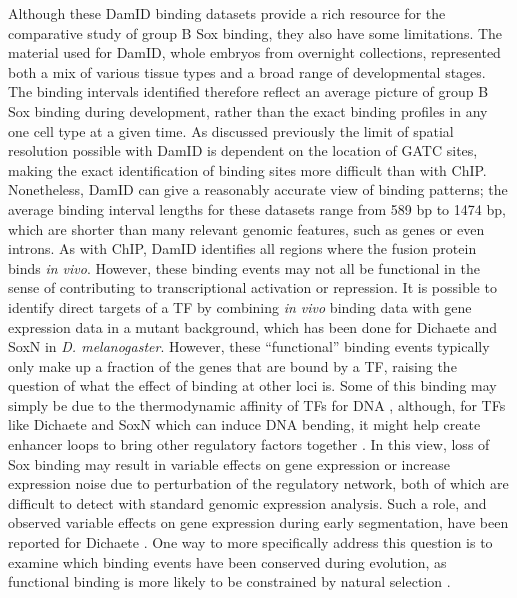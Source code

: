 Although these DamID binding datasets provide a rich resource for the comparative study of group B Sox binding, they also have some limitations. The material used for DamID, whole embryos from overnight collections, represented both a mix of various tissue types and a broad range of developmental stages. The binding intervals identified therefore reflect an average picture of group B Sox binding during development, rather than the exact binding profiles in any one cell type at a given time. As discussed previously the limit of spatial resolution possible with DamID is dependent on the location of GATC sites, making the exact identification of binding sites more difficult than with ChIP. Nonetheless, DamID can give a reasonably accurate view of binding patterns; the average binding interval lengths for these datasets range from 589 bp to 1474 bp, which are shorter than many relevant genomic features, such as genes or even introns. As with ChIP, DamID identifies all regions where the fusion protein binds \emph{in vivo}. However, these binding events may not all be functional in the sense of contributing to transcriptional activation or repression. It is possible to identify direct targets of a TF by combining \emph{in vivo} binding data with gene expression data in a mutant background, which has been done for Dichaete and SoxN in \emph{D. melanogaster}. However, these “functional” binding events typically only make up a fraction of the genes that are bound by a TF, raising the question of what the effect of binding at other loci is. Some of this binding may simply be due to the thermodynamic affinity of TFs for DNA \citep{biggin_animal_2011,fisher_dna_2012,kaplan_quantitative_2011}, although, for TFs like Dichaete and SoxN which can induce DNA bending, it might help create enhancer loops to bring other regulatory factors together \citep{ghavi-helm_enhancer_2014}. In this view, loss of Sox binding may result in variable effects on gene expression or increase expression noise due to perturbation of the regulatory network, both of which are difficult to detect with standard genomic expression analysis. Such a role, and observed variable effects on gene expression during early segmentation, have been reported for Dichaete \citep{russell_dichaete_1996}. One way to more specifically address this question is to examine which binding events have been conserved during evolution, as functional binding is more likely to be constrained by natural selection \citep{biggin_animal_2011}.\\


